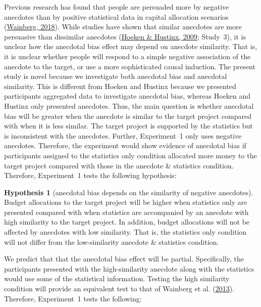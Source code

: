 \documentclass[
  man, donotrepeattitle,floatsintext]{apa7}
\theoremstyle{definition}
\theoremstyle{definition}
\theoremstyle{definition}
\theoremstyle{definition}
\newtheorem{hypothesis}{Hypothesis}
\theoremstyle{remark}
\begin{document}
Previous research has found that people are persuaded more by negative anecdotes
than by positive statistical data in capital allocation scenarios
(\protect\hyperlink{ref-wainberg2018}{Wainberg, 2018}). While studies have shown that similar anecdotes are more
persuasive than dissimilar anecdotes (\protect\hyperlink{ref-hoeken2009}{Hoeken \& Hustinx, 2009}; Study~3), it is unclear how
the anecdotal bias effect may depend on anecdote similarity. That is, it is
unclear whether people will respond to a simple negative association of the
anecdote to the target, or use a more sophisticated causal induction. The
present study is novel because we investigate both anecdotal bias and anecdotal
similarity. This is different from Hoeken and Hustinx because we presented
participants aggregated data to investigate anecdotal bias, whereas Hoeken and
Hustinx only presented anecdotes. Thus, the main question is whether anecdotal
bias will be greater when the anecdote is similar to the target project compared
with when it is less similar. The target project is supported by the statistics
but is inconsistent with the anecdotes. Further, Experiment~1 only uses negative
anecdotes. Therefore, the experiment would show evidence of anecdotal bias if
participants assigned to the statistics only condition allocated more money to
the target project compared with those in the anecdote \& statistics condition.
Therefore, Experiment~1 tests the following hypothesis:

\begin{hypothesis}[anecdotal bias depends on the similarity of negative anecdotes]
\protect\hypertarget{hyp:anecdote-similarity-anecdotes-1}{}\label{hyp:anecdote-similarity-anecdotes-1}Budget allocations to the target project will be higher when statistics only are
presented compared with when statistics are accompanied by an anecdote with high
similarity to the target project. In addition, budget allocations will not be
affected by anecdotes with low similarity. That is, the statistics only
condition will not differ from the low-similarity anecdote \& statistics
condition.
\end{hypothesis}

We predict that that the anecdotal bias effect will be partial. Specifically,
the participants presented with the high-similarity anecdote along with the
statistics would use some of the statistical information. Testing the high
similarity condition will provide an equivalent test to that of Wainberg et al. (\protect\hyperlink{ref-wainberg2013}{2013}).
Therefore, Experiment~1 tests the following:
\end{document}
